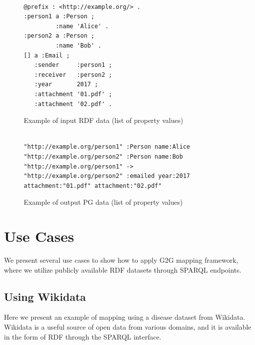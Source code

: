 \documentclass[runningheads]{llncs}
\begin{document}
\begin{figure}[!t]
\begin{scriptsize}
\begin{verbatim}

@prefix : <http://example.org/> .
:person1 a :Person ;
         :name 'Alice' .
:person2 a :Person ;
         :name 'Bob' .
[] a :Email ;
   :sender     :person1 ;
   :receiver   :person2 ;
   :year       2017 ;
   :attachment '01.pdf' ;
   :attachment '02.pdf' .

\end{verbatim}
\end{scriptsize}
\caption{Example of input RDF data (list of property values)}
\label{fig:example-rdf3}
\end{figure}


\begin{figure}[!t]
\begin{scriptsize}
\begin{verbatim}

"http://example.org/person1" :Person name:Alice
"http://example.org/person2" :Person name:Bob
"http://example.org/person1" -> "http://example.org/person2" :emailed year:2017 attachment:"01.pdf" attachment:"02.pdf"

\end{verbatim}
\end{scriptsize}
\caption{Example of output PG data (list of property values)}
\label{fig:example-pg3}
\end{figure}



\section{Use Cases}
 
We present several use cases to show how to apply G2G mapping framework, where we utilize publicly available RDF datasets through SPARQL endpoints.

 
\subsection{Using Wikidata}
 
Here we present an example of mapping using a disease dataset from Wikidata. Wikidata is a useful source of open data from various domains, and it is available in the form of RDF through the SPARQL interface.
 
\end{document}
